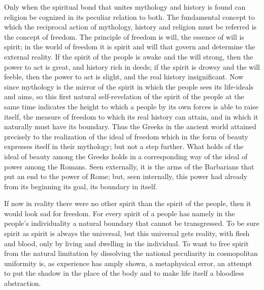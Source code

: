 \documentclass[12pt,a4paper,openany]{book}
\newcommand{\opage}[1]{\marginnote{\footnotesize\textit{[#1]}}}
\begin{document}
Only when the spiritual bond that unites mythology
and history is found can religion be cognized in
its peculiar relation to both. The fundamental concept
to which the reciprocal action of mythology, history and religion
must be referred is the concept of freedom. The principle of freedom
is will, the essence of will is spirit; in the world of freedom
it is spirit and will that govern and determine
the external reality. If the spirit of the people is awake and the will
strong, then the power to act is great, and history rich
in deeds; if the spirit is drowsy and the will feeble, then
the power to act is slight, and the real history insignificant.
Now since mythology is the mirror of the spirit in which
the people sees its life-ideals and aims, so
this first natural self-revelation of the spirit of the people
at the same time indicates the height to which a people by its own forces
is able to raise itself, the measure of freedom to which
its real history can attain, and in which it naturally
must have its boundary. Thus the Greeks
in the ancient world attained precisely to the realization of the
ideal of freedom which in the form of beauty expresses itself
in their mythology; but not a step further.
What holds of the ideal of beauty among the Greeks
holds in a corresponding way of the ideal of power among the Romans.
Seen externally, it is the arms of the Barbarians that
put an end to the power of Rome; but, seen internally, this
power had already from its beginning its goal, its
boundary in itself.

\setcounter{footnote}{0}%
\opage{434}If now in reality there were no other
spirit than the spirit of the people, then it would look sad
for freedom. For every spirit of a people has namely in the people's
individuality a natural boundary that cannot be transgressed.
To be sure spirit as spirit is always the universal, but
this universal gets reality, with flesh and blood,
only by living and dwelling in the individual. To want to free
spirit from the natural limitation by dissolving
the national peculiarity in cosmopolitan uniformity
is, as experience has amply shown, a metaphysical
error, an attempt to put the shadow in the
place of the body and to make life itself a bloodless abstraction.
\end{document}
